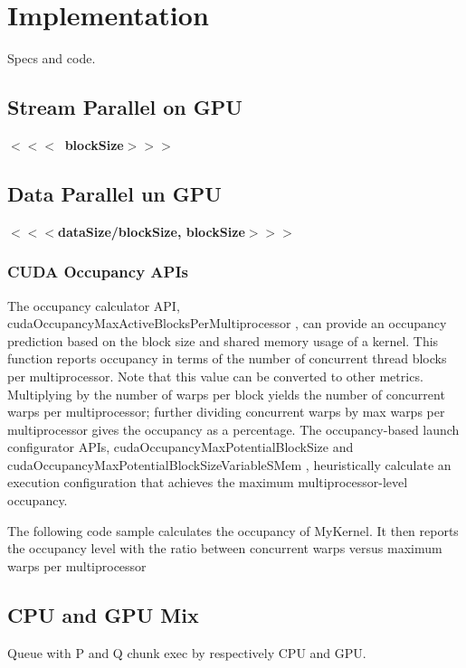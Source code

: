 \chapter{Implementation} 
\label{chap:impl}

Specs and code.
	


\section{Stream Parallel on GPU}
	\textbf{\(<<<\)\, blockSize\(>>>\)}

\section{Data Parallel un GPU}
	\textbf{\(<<<\)dataSize/blockSize, blockSize\(>>>\)}
	
	
	\subsection{CUDA Occupancy APIs}
	The occupancy calculator API,
	cudaOccupancyMaxActiveBlocksPerMultiprocessor , can provide an
	occupancy prediction based on the block size and shared memory usage of a kernel.
	This function reports occupancy in terms of the number of concurrent thread blocks
	per multiprocessor.
	Note that this value can be converted to other metrics. Multiplying by
	the number of warps per block yields the number of concurrent warps
	per multiprocessor; further dividing concurrent warps by max warps per
	multiprocessor gives the occupancy as a percentage.
	The occupancy-based launch configurator APIs,
	cudaOccupancyMaxPotentialBlockSize and
	cudaOccupancyMaxPotentialBlockSizeVariableSMem , heuristically calculate
	an execution configuration that achieves the maximum multiprocessor-level
	occupancy.
	
	The following code sample calculates the occupancy of MyKernel. It then reports the
	occupancy level with the ratio between concurrent warps versus maximum warps per
	multiprocessor
	
\section{CPU and GPU Mix}
Queue with P and Q chunk exec by respectively CPU and GPU.

